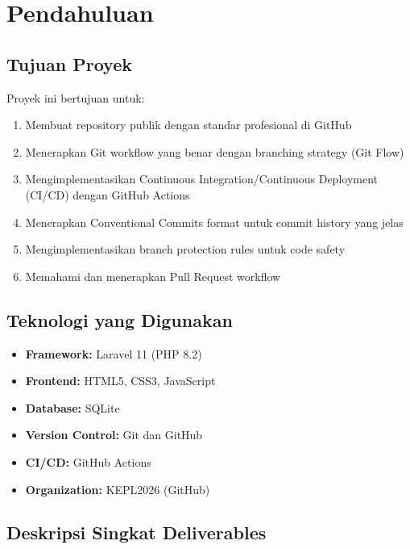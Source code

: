 \documentclass[a4paper,oneside,11pt]{book}
\begin{document}
\tableofcontents
\newpage


\chapter{Pendahuluan}

\section{Tujuan Proyek}

Proyek ini bertujuan untuk:
\begin{enumerate}
    \item Membuat repository publik dengan standar profesional di GitHub
    \item Menerapkan Git workflow yang benar dengan branching strategy (Git Flow)
    \item Mengimplementasikan Continuous Integration/Continuous Deployment (CI/CD) dengan GitHub Actions
    \item Menerapkan Conventional Commits format untuk commit history yang jelas
    \item Mengimplementasikan branch protection rules untuk code safety
    \item Memahami dan menerapkan Pull Request workflow
\end{enumerate}

\section{Teknologi yang Digunakan}

\begin{itemize}
    \item \textbf{Framework:} Laravel 11 (PHP 8.2)
    \item \textbf{Frontend:} HTML5, CSS3, JavaScript
    \item \textbf{Database:} SQLite
    \item \textbf{Version Control:} Git dan GitHub
    \item \textbf{CI/CD:} GitHub Actions
    \item \textbf{Organization:} KEPL2026 (GitHub)
\end{itemize}

\section{Deskripsi Singkat Deliverables}
\end{document}

